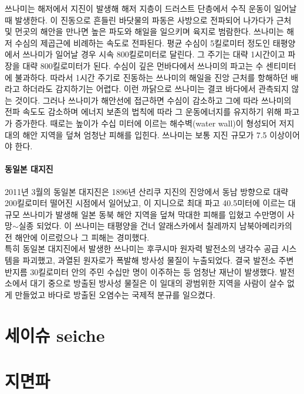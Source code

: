 \documentclass[12pt, a4paper, oneside]{book}
\begin{document}
	쓰나미는 해저에서 지진이 발생해 해저 지층이 드러스트 단층에서 수직 운동이 일어날때 발생한다.
	이 진동으로 흔들린 바닷물의 파동은 사방으로 전파되어 나가다가 근처 및 먼곳의 해안을 만나면 높은 파도와 해일을 일으키며 육지로 범람한다.
	 쓰나미는 해저 수심의 제곱근에 비례하는 속도로 전파된다.
	 평균 수심이 5킬로미터 정도인 태평양에서 쓰나미가 일어날 경우 시속 800킬로미터로 달린다.
	 그 주기는 대략 1시간이고 파장을 대략 800킬로미터가 된다.
	 수심이 깊은 먼바다에서 쓰나미의 파고는 수 센티미터에 불과하다. 따라서 1시간 주기로 진동하는 쓰나미의 해일을 진앙 근처를 항해하던 배라고 하더라도 감지하기는 어렵다.
	 이런 까닭으로 쓰나미는 결코 바다에서 관측되지 않는 것이다. 
	 그러나 쓰나미가 해안선에 접근하면 수심이 감소하고 그에 따라 쓰나미의 전파 속도도 감소하며 에너지 보존의 법칙에 따라 그 운동에너지를 유지하기 위해 파고가 증가한다. 
	 때로는 높이가 수십 미터에 이르는 해수벽(water wall)이 형성되어 저지대의 해안 지역을 덮쳐 엄청난 피해를 입힌다.
	 쓰나미는 보통 지진 규모가 7.5 이상이어야 한다.
	 
	 \paragraph{동일본 대지진}
	 2011년 3월의 동일본 대지진은 1896년 산리쿠 지진의 진앙에서 동남 방향으로 대략 200킬로미터 떨어진 시점에서 일어났고, 이 지니으로 최대 파고 40.5미터에 이르는 대규모 쓰나미가 발생해 일본 동북 해안 지역을 덮쳐 막대한 피해를 입혔고 수만명이 사망$\sim$실종 되었다.
	 이 쓰나미는 태평양을 건너 알래스카에서 칠레까지 남북아메리카의 전 해안에 이르렀으나 그 피해는 경미했다.\\
	 
	특히 동일본 대지진에서 발생한 쓰나미는 후쿠시마 원자력 발전소의 냉각수 공급 시스템을 파괴했고, 과열된 원자로가 폭발해 방사성 물질이 누출되었다.
	결국 발전소 주변 반지름 30킬로미터 안의 주민 수십만 명이 이주하는 등 엄청난 재난이 발생했다.
	발전소에서 대기 중으로 방출된 방사성 물질은 이 일대의 광범위한 지역을 사람이 살수 없게 만들었고 바다로 방출된 오염수는 국제적 분규를 일으켰다.
	
	 
 



	\clearpage
	\section{세이슈 seiche}
	

	\section{지면파}
\end{document}
